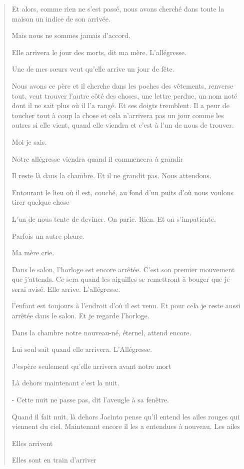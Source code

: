 \begin{quote}
Et alors, comme rien ne s'est passé, nous avons cherché dans toute la
maison un indice de son arrivée.

Mais nous ne sommes jamais d'accord.

Elle arrivera le jour des morts, dit ma mère. L'allégresse.

Une de mes sœurs veut qu'elle arrive un jour de fête.

Nous avons ce père et il cherche dans les poches des vêtements, renverse
tout, veut trouver l'autre côté des choses, une lettre perdue, un nom
noté dont il ne sait plus où il l'a rangé. Et ses doigts tremblent. Il a
peur de toucher tout à coup la chose et cela n'arrivera pas un jour
comme les autres si elle vient, quand elle viendra et c'est à l'un de
nous de trouver.

Moi je sais.

Notre allégresse viendra quand il commencera à grandir

Il reste là dans la chambre. Et il ne grandit pas. Nous attendons.

Entourant le lieu où il est, couché, au fond d'un puits d'où nous
voulons tirer quelque chose

L'un de nous tente de deviner. On parie. Rien. Et on s'impatiente.

Parfois un autre pleure.

Ma mère crie.

Dans le salon, l'horloge est encore arrêtée. C'est son premier mouvement
que j'attends. Ce sera quand les aiguilles se remettront à bouger que je
serai avisé. Elle arrive. L'allégresse.

l'enfant est toujours à l'endroit d'où il est venu. Et pour cela je
reste aussi arrêtée dans le salon. Et je regarde l'horloge.

Dans la chambre notre nouveau-né, éternel, attend encore.

Lui seul sait quand elle arrivera. L'Allégresse.

J'espère seulement qu'elle arrivera avant notre mort

Là dehors maintenant c'est la nuit.

- Cette nuit ne passe pas, dit l'aveugle à sa fenêtre.

Quand il fait nuit, là dehors Jacinto pense qu'il entend les ailes
rouges qui viennent du ciel. Maintenant encore il les a entendues à
nouveau. Les ailes

Elles arrivent

Elles sont en train d'arriver


\end{quote}
